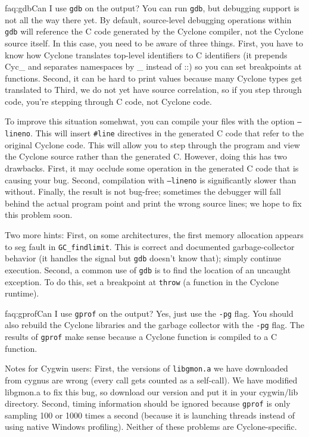 \begin{faqa}{faq:gdb}{Can I use \texttt{gdb} on the output?}
You can run {\tt gdb}, but debugging support is not all the way there yet.
By default, source-level debugging operations within {\tt gdb} will
reference the C code generated by the Cyclone compiler, not the Cyclone
source itself.  In this case, you need to be aware of three things.  First,
you have to know how Cyclone translates top-level identifiers to C
identifiers (it prepends Cyc_ and separates namespaces by _ instead of ::)
so you can set breakpoints at functions.  Second, it can be hard to print
values because many Cyclone types get translated to   Third,
we do not yet have source correlation, so if you step through code, you're
stepping through C code, not Cyclone code.

To improve this situation somehwat, you can compile your files with the
option \texttt{--lineno}.  This will insert \texttt{#line} directives in the
generated C code that refer to the original Cyclone code.  This will allow
you to step through the program and view the Cyclone source rather than the
generated C.  However, doing this has two drawbacks.  First, it may occlude
some operation in the generated C code that is causing your bug.  Second,
compilation with \texttt{--lineno} is significantly slower than without.
Finally, the result is not bug-free; sometimes the debugger will fall behind
the actual program point and print the wrong source lines; we hope to fix
this problem soon.

Two more hints: First, on some architectures, the first memory
allocation appears to seg fault in \texttt{GC_findlimit}.  This is
correct and documented garbage-collector behavior (it handles the
signal but \texttt{gdb} doesn't know that); simply continue execution.
Second, a common use of \texttt{gdb} is to find the location of an
uncaught exception.  To do this, set a breakpoint at \texttt{throw} (a
function in the Cyclone runtime).
\end{faqa}

\begin{faqa}{faq:gprof}{Can I use \texttt{gprof} on the output?}
Yes, just use the \texttt{-pg} flag.  You should also rebuild the
Cyclone libraries and the garbage collector with the \texttt{-pg}
flag.  The results of \texttt{gprof} make sense because a Cyclone
function is compiled to a C function.

Notes for Cygwin users: First, the versions of \texttt{libgmon.a} we
have downloaded from cygnus are wrong (every call gets counted as a
self-call).  We have modified libgmon.a to fix this bug, so download
our version and put it in your cygwin/lib directory.  Second, timing
information should be ignored because \texttt{gprof} is only sampling
100 or 1000 times a second (because it is launching threads instead of
using native Windows profiling).  Neither of these problems are
Cyclone-specific.
\end{faqa}

